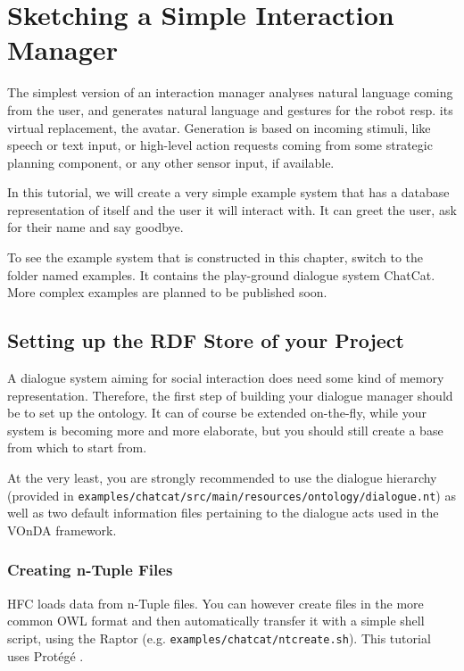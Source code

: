 \documentclass[a4paper]{report}
\newcommand{\vonda}{VOnDA\xspace}
\begin{document}
\chapter{Sketching a Simple Interaction Manager}

The simplest version of an interaction manager analyses natural language
coming from the user, and generates natural language and gestures for the robot
resp. its virtual replacement, the avatar. Generation is based on incoming
stimuli, like speech or text input, or high-level action requests coming from
some strategic planning component, or any other sensor input, if available.

In this tutorial, we will create a very simple example system that has a database representation of itself and the user it will interact with. It can greet the user, ask for their name and say goodbye.

To see the example system that is constructed in this chapter, switch to the folder named examples. It contains the play-ground dialogue system ChatCat. More complex examples are planned to be published soon.

\section{Setting up the RDF Store of your Project} \label{sec:example-hfc}

A dialogue system aiming for social interaction does need some kind of memory representation. Therefore, the first step of building your dialogue manager should be to set up the ontology. It can of course be extended on-the-fly, while your system is becoming more and more elaborate, but you should still create a base from which to start from.

At the very least, you are strongly recommended to use the dialogue hierarchy (provided in \texttt{examples/chatcat/src/main/resources/ontology/dialogue.nt}) as well as two default information files pertaining to the dialogue acts used in the \vonda framework.

\subsection{Creating n-Tuple Files}

HFC loads data from n-Tuple files. You can however create files in the more common OWL format and then automatically transfer it with a simple shell script, using the Raptor \citep{raptor} (e.g. \texttt{examples/chatcat/ntcreate.sh}). This tutorial uses Protégé \citep{Protege}.
\end{document}
